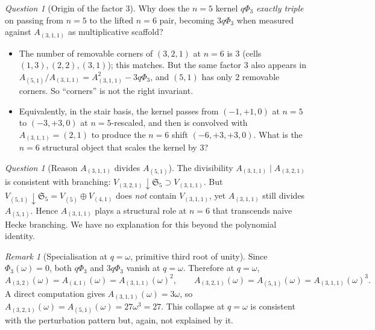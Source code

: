 \documentclass[11pt]{article}
\theoremstyle{plain}
\theoremstyle{definition}
\theoremstyle{remark}
\newtheorem{remark}[theorem]{Remark}
\newtheorem{question}[theorem]{Question}
\newcommand{\Sym}{\mathfrak{S}}
\newcommand{\PhiThree}{\Phi_3}
\begin{document}
\begin{question}[Origin of the factor $3$]
Why does the $n=5$ kernel $q\PhiThree$ \emph{exactly triple} on passing from
$n=5$ to the lifted $n=6$ pair, becoming $3 q\PhiThree$ when measured against
$A_{(3,1,1)}$ as multiplicative scaffold?
\begin{itemize}[leftmargin=2em]
    \item The number of removable corners of $(3,2,1)$ at $n=6$ is $3$ (cells
          $(1,3), (2,2), (3,1)$); this matches.  But the same factor $3$ also
          appears in $A_{(5,1)}/A_{(3,1,1)} = A_{(3,1,1)}^2 - 3q\PhiThree$,
          and $(5,1)$ has only $2$ removable corners.  So ``corners'' is not
          the right invariant.
    \item Equivalently, in the stair basis, the kernel passes from $(-1, +1, 0)$
          at $n=5$ to $(-3, +3, 0)$ at $n=5$-rescaled, and then is convolved with
          $A_{(3,1,1)} = (2, 1)$ to produce the $n=6$ shift $(-6, +3, +3, 0)$.
          What is the $n=6$ structural object that scales the kernel by $3$?
\end{itemize}
\end{question}

\begin{question}[Reason $A_{(3,1,1)}$ divides $A_{(5,1)}$]
The divisibility $A_{(3,1,1)} \mid A_{(3,2,1)}$ is consistent with branching:
$V_{(3,2,1)}\!\downarrow\!\Sym_5 \supset V_{(3,1,1)}$.  But
$V_{(5,1)}\!\downarrow\!\Sym_5 = V_{(5)} \oplus V_{(4,1)}$ does \emph{not}
contain $V_{(3,1,1)}$, yet $A_{(3,1,1)}$ still divides $A_{(5,1)}$.  Hence
$A_{(3,1,1)}$ plays a structural role at $n=6$ that transcends naive Hecke
branching.  We have no explanation for this beyond the polynomial identity.
\end{question}

\begin{remark}[Specialisation at $q = \omega$, primitive third root of unity]
\label{rem:omega}
Since $\PhiThree(\omega) = 0$, both $q\PhiThree$ and $3 q \PhiThree$ vanish at
$q = \omega$.  Therefore at $q = \omega$,
\[
A_{(3,2)}(\omega) = A_{(4,1)}(\omega) = A_{(3,1,1)}(\omega)^2,
\qquad
A_{(3,2,1)}(\omega) = A_{(5,1)}(\omega) = A_{(3,1,1)}(\omega)^3.
\]
A direct computation gives $A_{(3,1,1)}(\omega) = 3 \omega$, so
$A_{(3,2,1)}(\omega) = A_{(5,1)}(\omega) = 27 \omega^3 = 27$.  This collapse at
$q = \omega$ is consistent with the perturbation pattern but, again, not
explained by it.
\end{remark}
\end{document}

